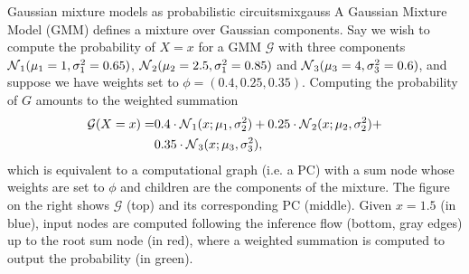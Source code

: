 \newcommand\mone{1}%
\newcommand\sone{0.65}%
\newcommand\mtwo{2.5}%
\newcommand\stwo{0.85}%
\newcommand\mthr{4}%
\newcommand\sthr{0.6}%
\begin{example}[sidebyside,lefthand width=0.55\textwidth]{Gaussian mixture models as probabilistic circuits}{mixgauss}
  A Gaussian Mixture Model (GMM) defines a mixture over Gaussian components. Say we wish to compute
  the probability of $X=x$ for a GMM $\mathcal{G}$ with three components
  $\gaussian_1(\mu_1=\mone,\sigma^2_1=\sone)$, $\gaussian_2(\mu_2=\mtwo, \sigma^2_1=\stwo)$ and
  $\gaussian_3(\mu_3=\mthr,\sigma^2_3=\sthr)$, and suppose we have weights set to
  $\phi=(0.4,0.25,0.35)$. Computing the probability of $G$ amounts to the weighted summation
  \begin{align*}
    \mathcal{G}(X=x)=&0.4\cdot\operatorname{\mathcal{N}}_1(x;\mu_1,\sigma^2_2)+0.25\cdot\operatorname{\mathcal{N}}_2(x;\mu_2,\sigma^2_2)+\\
                     &0.35\cdot\operatorname{\mathcal{N}}_3(x;\mu_3,\sigma^2_3),
  \end{align*}
  which is equivalent to a computational graph (i.e. a PC) with a sum node whose weights are set to
  $\phi$ and children are the components of the mixture. The figure on the right shows
  $\mathcal{G}$ (top) and its corresponding PC (middle). Given $x=1.5$ (in blue), input nodes are
  computed following the inference flow (bottom, gray edges) up to the root sum node (in red),
  where a weighted summation is computed to output the probability (in green).


\end{example}
